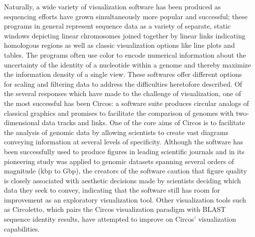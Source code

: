 \documentclass[twocolumn]{article}
\begin{document}
Naturally, a wide variety of visualization software has been produced as sequencing efforts have grown simultaneously more popular and successful; these programs in general represent sequence data as a variety of separate, static windows depicting linear chromosomes joined together by linear links indicating homologous regions as well as classic visualization options like line plots and tables. The programs often use color to encode numerical information about the uncertainty of the identity of a nucleotide within a genome and thereby maximize the information density of a single view. These softwares offer different options for scaling and filtering data to address the difficulties heretofore described. Of the several responses which have made to the challenge of visualization, one of the most successful has been Circos: a software suite produces circular analogs of classical graphics and promises to facilitate the comparison of genomes with two-dimensional data tracks and links. One of the core aims of Circos is to facilitate the analysis of genomic data by allowing scientists to create vast diagrams conveying information at several levels of specificity. Although the software has been successfully used to produce figures in leading scientific journals and in its pioneering study was applied to genomic datasets spanning several orders of magnitude (kbp to Gbp), the creators of the software caution that figure quality is closely associated with aesthetic decisions made by scientists deciding which data they seek to convey, indicating that the software still has room for improvement as an exploratory visualization tool. Other visualization tools such as Circoletto, which pairs the Circos visualization paradigm with BLAST sequence identity results, have attempted to improve on Circos' visualization capabilities. 
\end{document}

